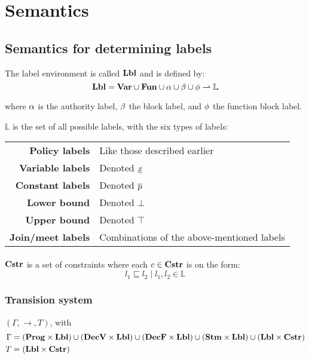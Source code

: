 \section{Semantics}

\subsection{Semantics for determining labels}
The label environment is called $\mathbf{Lbl}$ and is defined by:
\[
  \mathbf{Lbl} = \mathbf{Var} \cup \mathbf{Fun} \cup \alpha \cup \beta \cup \phi \rightharpoonup \mathbb{L}
\]

\noindent where $\alpha$ is the authority label, $\beta$ the block label, and $\phi$ the function block label.

\noindent $\mathbb{L}$ is the set of all possible labels, with the six types of labels: \\

\begin{tabular}{rl}
  \textbf{Policy labels}    & Like those described earlier \\
  \textbf{Variable labels}  & Denoted $\underline{x}$ \\
  \textbf{Constant labels}  & Denoted $\overline{p}$ \\
  \textbf{Lower bound}      & Denoted $\bot$ \\
  \textbf{Upper bound}      & Denoted $\top$ \\
  \textbf{Join/meet labels} & Combinations of the above-mentioned labels
\end{tabular}

\paragraph{}\noindent
$\mathbf{Cstr}$ is a set of constraints where each $c \in \mathbf{Cstr}$ is on the form:
\[ l_1 \sqsubseteq l_2 \; | \; l_1, l_2 \in \mathbb{L} \]


\subsubsection{Transision system}
$(\Gamma, \rightarrow, T)$, with
\begin{align*}
  \Gamma & = (\mathbf{Prog} \times \mathbf{Lbl})
                  \cup (\mathbf{DecV} \times \mathbf{Lbl})
                  \cup (\mathbf{DecF} \times \mathbf{Lbl})
                  \cup (\mathbf{Stm} \times \mathbf{Lbl})
                  \cup (\mathbf{Lbl} \times \mathbf{Cstr}) \\
  T & = (\mathbf{Lbl} \times \mathbf{Cstr})
\end{align*}


